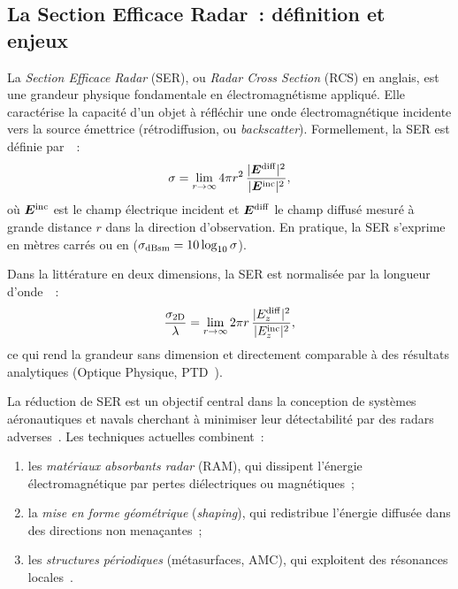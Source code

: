 \documentclass[12pt,a4paper]{article}
\newcommand{\vE}{\bm{E}}
\begin{document}
\subsection{La Section Efficace Radar~: définition et enjeux}

La \textit{Section Efficace Radar} (SER), ou \textit{Radar Cross Section} (RCS)
en anglais, est une grandeur physique fondamentale en électromagnétisme appliqué.
Elle caractérise la capacité d'un objet à réfléchir une onde électromagnétique incidente
vers la source émettrice (rétrodiffusion, ou \textit{backscatter}). Formellement, la
SER est définie par~\cite{Knott1993,Balanis2012}~:
\begin{equation}
    \sigma = \lim_{r \to \infty} 4\pi r^2 \,
    \frac{|\vE^{\rm diff}|^2}{|\vE^{\rm inc}|^2},
    \label{eq:rcs-3d}
\end{equation}
où $\vE^{\rm inc}$ est le champ électrique incident et $\vE^{\rm diff}$ le champ
diffusé mesuré à grande distance $r$ dans la direction d'observation. En pratique,
la SER s'exprime en mètres carrés ou en \si{\dBsm} ($\sigma_{\rm dBsm} = 10\log_{10}\sigma$).

Dans la littérature en deux dimensions, la SER est normalisée par la longueur
d'onde~\cite{Taflove2005}~:
\begin{equation}
    \frac{\sigma_{\rm 2D}}{\lambda} = \lim_{r \to \infty} 2\pi r \,
    \frac{|E_z^{\rm diff}|^2}{|E_z^{\rm inc}|^2},
    \label{eq:rcs-2d-def}
\end{equation}
ce qui rend la grandeur sans dimension et directement comparable à des résultats
analytiques (Optique Physique, PTD~\cite{Ufimtsev2007}).

La réduction de SER est un objectif central dans la conception de systèmes
aéronautiques et navals cherchant à minimiser leur détectabilité par des radars
adverses~\cite{Skolnik2001,Jenn1995}. Les techniques actuelles combinent~:
\begin{enumerate}
    \item les \textit{matériaux absorbants radar} (RAM), qui dissipent l'énergie
          électromagnétique par pertes diélectriques ou magnétiques~;
    \item la \textit{mise en forme géométrique} (\textit{shaping}), qui redistribue
          l'énergie diffusée dans des directions non menaçantes~;
    \item les \textit{structures périodiques} (métasurfaces, AMC), qui exploitent
          des résonances locales~\cite{Chen2010}.
\end{enumerate}
\end{document}
